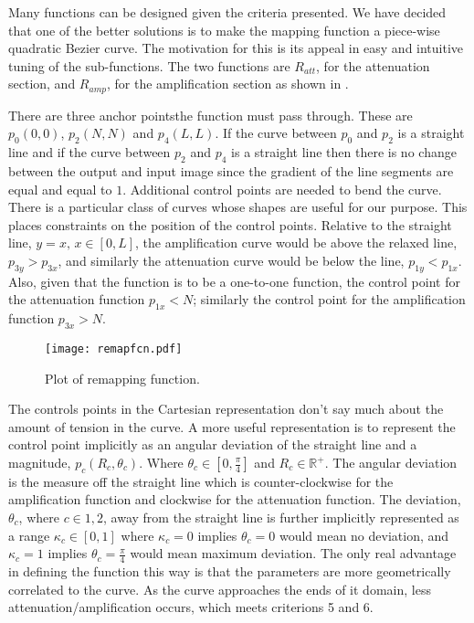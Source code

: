 \begin{definition}
	Many functions can be designed given the criteria presented. We have decided that one of the better solutions is to make the mapping function a piece-wise quadratic Bezier curve. The motivation for this is its appeal in easy and intuitive tuning of the sub-functions. The two functions are $R_{att}$, for the attenuation section, and $R_{amp}$, for the amplification section as shown in .
	
	There are three anchor pointsthe function must pass through. These are $p_0(0,0)$, $p_2(N, N)$ and $p_4(L,L)$. If the curve between $p_0$ and $p_2$ is a straight line and if the curve between $p_2$ and $p_4$ is a straight line then there is no change between the output and input image since the gradient of the line segments are equal and equal to $1$. Additional control points are needed to bend the curve.
	There is a particular class of curves whose shapes are useful for our purpose. This places constraints on the position of the control points. Relative to the straight line, $y=x, \, x \in [0,L]$, the amplification curve would be above the relaxed line, $p_{3y} > p_{3x}$, and similarly the attenuation curve would be below the line, $p_{1y} < p_{1x}$. Also, given that the function is to be a one-to-one function, the control point for the attenuation function $p_{1x}<N$; similarly the control point for the amplification function $p_{3x}>N$.
	
	\begin{figure}[!h]
		\centering
		\texttt{[image: remapfcn.pdf]}
		\caption{Plot of remapping function.}
		\label{fig:remapfcn}
	\end{figure}
	
	The controls points in the Cartesian representation don't say much about the amount of tension in the curve. A more useful representation is to represent the control point implicitly as an angular deviation of the straight line and a magnitude, $p_c(R_c, \theta_c)$. Where $\theta_c \in [0, \frac{\pi}{4}]$ and $R_c \in \mathbb{R}^+$. The angular deviation is the measure off the straight line which is counter-clockwise for the amplification function and clockwise for the attenuation function. The deviation, $\theta_c$, where $c \in {1,2}$, away from the straight line is further implicitly represented as a range $\kappa_c \in [0,1]$ where $\kappa_c=0$ implies $\theta_c = 0$ would mean no deviation, and $\kappa_c = 1$ implies $\theta_c = \frac{\pi}{4}$ would mean maximum deviation.
	The only real advantage in defining the function this way is that the parameters are more geometrically correlated to the curve. As the curve approaches the ends of it domain, less attenuation/amplification occurs, which meets criterions 5 and 6.
	

\end{definition}

